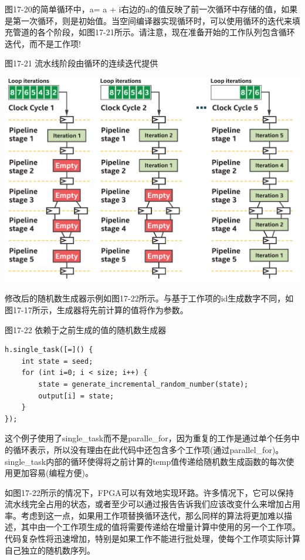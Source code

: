 图17-20的简单循环中，a= a + i右边的a的值反映了前一次循环中存储的值，如果是第一次循环，则是初始值。当空间编译器实现循环时，可以使用循环的迭代来填充管道的各个阶段，如图17-21所示。请注意，现在准备开始的工作队列包含循环迭代，而不是工作项!\par

\hspace*{\fill} \par %
图17-21 流水线阶段由循环的连续迭代提供
\begin{center}
	\includegraphics[width=1.0\textwidth]{content/chapter-17/images/17}
\end{center}

修改后的随机数生成器示例如图17-22所示。与基于工作项的id生成数字不同，如图17-17所示，生成器将先前计算的值将作为参数。\par

\hspace*{\fill} \par %
图17-22 依赖于之前生成的值的随机数生成器
\begin{lstlisting}[caption={}]
h.single_task([=]() {
	int state = seed;
	for (int i=0; i < size; i++) {
		state = generate_incremental_random_number(state);
		output[i] = state;
	}
});
\end{lstlisting}

这个例子使用了single\_task而不是paralle\_for，因为重复的工作是通过单个任务中的循环表示，所以没有理由在此代码中还包含多个工作项(通过parallel\_for)。single\_task内部的循环使得将之前计算的temp值传递给随机数生成函数的每次使用更加容易(编程方便)。\par

如图17-22所示的情况下，FPGA可以有效地实现环路。许多情况下，它可以保持流水线完全占用的状态，或者至少可以通过报告告诉我们应该改变什么来增加占用率。考虑到这一点，如果用工作项替换循环迭代，那么同样的算法将更加难以描述，其中由一个工作项生成的值将需要传递给在增量计算中使用的另一个工作项。代码复杂性将迅速增加，特别是如果工作不能进行批处理，使每个工作项实际计算自己独立的随机数序列。\par

